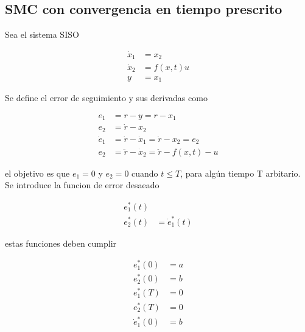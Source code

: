 \begin{flushright}
\end{flushright}

\subsection{SMC con convergencia en tiempo prescrito}

Sea el sistema SISO

\begin{equation*}
    \begin{aligned}
        \dot{x}_1 &= x_2 \\
        \dot{x}_2 &= f(x, t)  u\\
        y&= x_1
    \end{aligned}
\end{equation*}

Se define el error de seguimiento y sus derivadas como

\begin{equation*}
    \begin{aligned}
        e_1 &= r-y = r-x_1 \\
        e_2 &= \dot{r} -x_2 \\
        \dot{e}_1 &= \dot{r}- \dot{x}_1 = \dot{r}- x_2 = e_2 \\
        e_2 &= \ddot{r}- \dot{x}_2 = \ddot{r}-f(x,t)-u
    \end{aligned}
\end{equation*}

el objetivo es que $e_1=0$ y $e_2=0$ cuando $t\leq T$, para algún tiempo T arbitario. Se introduce la funcion de error desaeado

\begin{equation*}
    \begin{aligned}
        e_1^*(t)&\\
        e_2^*(t)&=\dot{e}_1^*(t)
    \end{aligned}
\end{equation*}

estas funciones deben cumplir

\begin{equation*}
    \begin{aligned}
        e_1^*(0) &= a \\
        e_2^*(0) &= b \\
        e_1^*(T) &= 0 \\
        e_2^*(T) &= 0 \\
        \dot{e}_1^*(0) &= b 
    \end{aligned}
\end{equation*}

